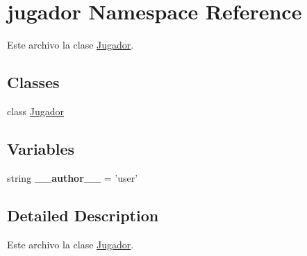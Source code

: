 \hypertarget{namespacejugador}{\section{jugador Namespace Reference}
\label{namespacejugador}
}


Este archivo la clase \hyperlink{classjugador_1_1_jugador}{Jugador}.  


\subsection*{Classes}
\begin{DoxyCompactItemize}
\item 
class \hyperlink{classjugador_1_1_jugador}{Jugador}
\end{DoxyCompactItemize}
\subsection*{Variables}
\begin{DoxyCompactItemize}
\item 
\hypertarget{namespacejugador_ada3eb1b740a09b709349b803b419d86e}{string {\bfseries \-\_\-\-\_\-author\-\_\-\-\_\-} = 'user'}\label{namespacejugador_ada3eb1b740a09b709349b803b419d86e}

\end{DoxyCompactItemize}


\subsection{Detailed Description}
Este archivo la clase \hyperlink{classjugador_1_1_jugador}{Jugador}. 